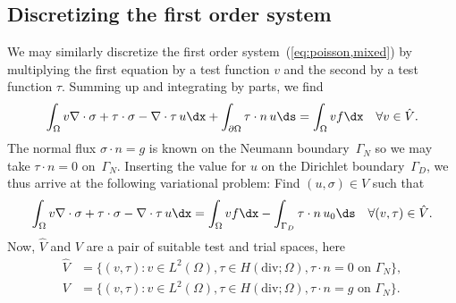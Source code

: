 \subsection{Discretizing the first order system}
\label{sec:kirby-7:mixed}

We may similarly discretize the first order
system~(\ref{eq:poisson,mixed}) by multiplying the first equation by
a test function $v$ and the second by a test function $\tau$. Summing up
and integrating by parts, we find
\begin{displaymath}
  \int_{\Omega} v \nabla \cdot \sigma + \tau \cdot \sigma
  - \nabla \cdot \tau \, u \dx +
  \int_{\partial\Omega} \tau \cdot n \, u \ds
  = \int_{\Omega} v f \dx
  \quad \forall v \in \hat{V}.
\end{displaymath}
The normal flux $\sigma \cdot n = g$ is known on the Neumann
boundary~$\Gamma_N$ so we may take $\tau \cdot n = 0$ on~$\Gamma_N$.
Inserting the value for $u$ on the Dirichlet boundary~$\Gamma_D$, we
thus arrive at the following variational problem:
Find $(u, \sigma) \in V$ such that
\begin{equation} \label{eq:poisson,varproblem,mixed}
  \int_{\Omega} v \nabla \cdot \sigma + \tau \cdot \sigma
  - \nabla \cdot \tau \, u \dx
  = \int_{\Omega} v f \dx - \int_{\Gamma_D} \tau \cdot n \, u_0 \ds
  \quad \forall (v, \tau) \in \hat{V}.
\end{equation}
Now, $\hat{V}$ and $V$ are a pair of suitable test and trial
spaces, here
\begin{displaymath}
  \begin{split}
    \hat{V} &= \{(v, \tau) : v \in L^2(\Omega), \tau \in H(\mathrm{div};\Omega), \tau \cdot n = 0 \mbox{ on } \Gamma_N\}, \\
    V       &= \{(v, \tau) : v \in L^2(\Omega), \tau \in H(\mathrm{div};\Omega), \tau \cdot n = g \mbox{ on } \Gamma_N\}.
  \end{split}
\end{displaymath}

